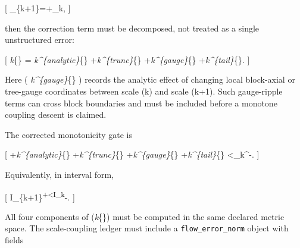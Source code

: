 \documentclass[
]{article}
\begin{document}
{[} \beta\_\{k+1\}=+\Delta\_k, {]}

then the correction term must be decomposed, not treated as a single
unstructured error:

{[} \textbar{}\Delta\emph{k\textbar{}}\{\max\} =
\textbar{}\Delta\emph{k\^{}\{\rm analytic\}\textbar{}}\{\max\}
+\textbar{}\Delta\emph{k\^{}\{\rm trunc\}\textbar{}}\{\max\}
+\textbar{}\Delta\emph{k\^{}\{\rm gauge\}\textbar{}}\{\max\}
+\textbar{}\Delta\emph{k\^{}\{\rm tail\}\textbar{}}\{\max\}. {]}

Here ( \textbar{}\Delta\emph{k\^{}\{\rm gauge\}\textbar{}}\{\max\} )
records the analytic effect of changing local block-axial or tree-gauge
coordinates between scale (k) and scale (k+1). Such gauge-ripple terms
can cross block boundaries and must be included before a monotone
coupling descent is claimed.

The corrected monotonicity gate is

{[} 
+\textbar{}\Delta\emph{k\^{}\{\rm analytic\}\textbar{}}\{\max\}
+\textbar{}\Delta\emph{k\^{}\{\rm trunc\}\textbar{}}\{\max\}
+\textbar{}\Delta\emph{k\^{}\{\rm gauge\}\textbar{}}\{\max\}
+\textbar{}\Delta\emph{k\^{}\{\rm tail\}\textbar{}}\{\max\}
\textless{}\beta\_k\^{}-. {]}

Equivalently, in interval form,

{[} I\_\{k+1\}\textsuperscript{+\textless I\_k}-. {]}

All four components of (\textbar{}\Delta\emph{k\textbar{}}\{\max\}) must
be computed in the same declared metric space. The scale-coupling ledger
must include a \texttt{flow\_error\_norm} object with fields
\end{document}
